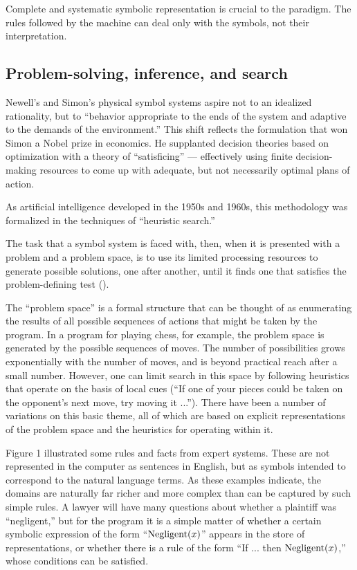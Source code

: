 \documentclass[12pt]{article}
\begin{document}
Complete and systematic symbolic representation is crucial to the
paradigm. The rules followed by the machine can deal only with the
symbols, not their interpretation.

\subsection{Problem-solving, inference, and search}

Newell's and Simon's physical symbol systems aspire not to an idealized rationality, but to ``behavior appropriate to the ends of the system and adaptive to the demands of the environment.'' This shift reflects the formulation that won Simon a Nobel prize in economics. He supplanted decision theories based on optimization with a theory of ``satisficing'' --- effectively using finite decision-making resources to come up with adequate, but not necessarily optimal plans of action.

As artificial intelligence developed in the 1950s and 1960s, this methodology was formalized in the techniques of ``heuristic search.''

The task that a symbol system is faced with, then, when it is presented with a problem and a problem space, is to use its limited processing resources to generate possible solutions, one after another, until it finds one that satisfies the problem-defining test (\cite{newell1976}).

The ``problem space'' is a formal structure that can be thought of as enumerating the results of all possible sequences of actions that might be taken by the program. In a program for playing chess, for example, the problem space is generated by the possible sequences of moves. The number of possibilities grows exponentially with the number of moves, and is beyond practical reach after a small number. However, one can limit search in this space by following heuristics that operate on the basis of local cues (``If one of your pieces could be taken on the opponent's next move, try moving it ...''). There have been a number of variations on this basic theme, all of which are based on explicit representations of the problem space and the heuristics for operating within it.

Figure 1 illustrated some rules and facts from expert systems. These are not represented in the computer as sentences in English, but as symbols intended to correspond to the natural language terms. As these examples indicate, the domains are naturally far richer and more complex than can be captured by such simple rules. A lawyer will have many questions about whether a plaintiff was ``negligent,'' but for the program it is a simple matter of whether a certain symbolic expression of the form ``$\mathop {\rm Negligent}(x)$'' appears in the store of representations, or whether there is a rule of the form ``If ... then $\mathop {\rm Negligent}(x)$,'' whose conditions can be satisfied.
\end{document}
